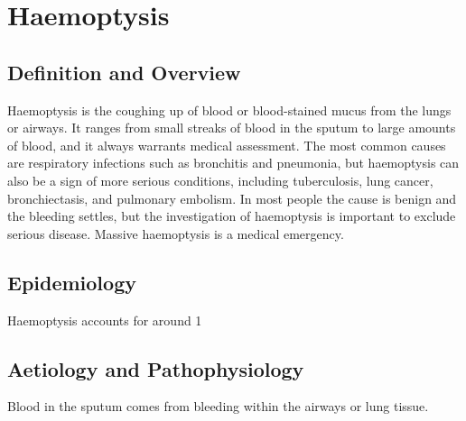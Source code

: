 \chapter{Haemoptysis}

\section*{Definition and Overview}
Haemoptysis is the coughing up of blood or blood-stained mucus from the lungs or airways. It ranges from small streaks of blood in the sputum to large amounts of blood, and it always warrants medical assessment. The most common causes are respiratory infections such as bronchitis and pneumonia, but haemoptysis can also be a sign of more serious conditions, including tuberculosis, lung cancer, bronchiectasis, and pulmonary embolism. In most people the cause is benign and the bleeding settles, but the investigation of haemoptysis is important to exclude serious disease. Massive haemoptysis is a medical emergency.

\section*{Epidemiology}
Haemoptysis accounts for around 1%

\section*{Aetiology and Pathophysiology}
Blood in the sputum comes from bleeding within the airways or lung tissue.


